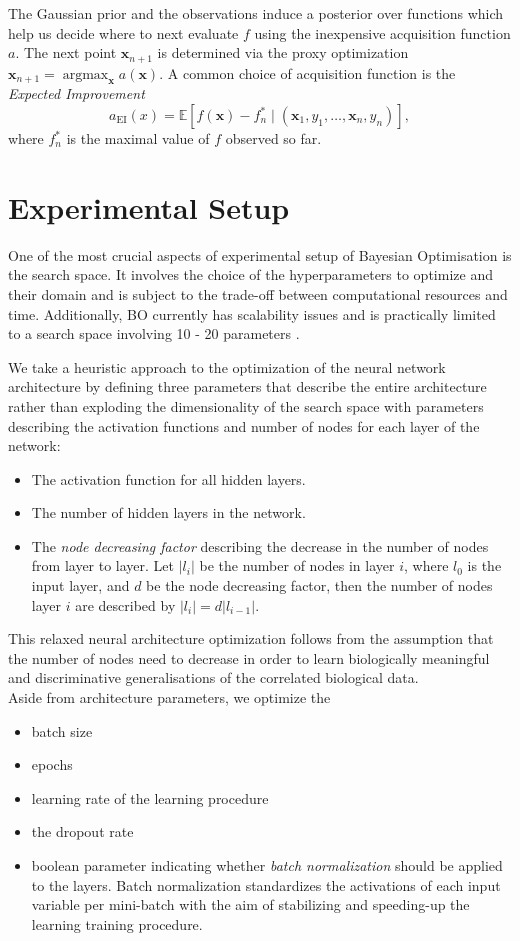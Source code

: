 \documentclass[bsc,frontabs,twoside,singlespacing,parskip,deptreport]{infthesis}     %
\let\Oldsection\section
\renewcommand{\section}{\FloatBarrier\Oldsection}
\begin{document}
The Gaussian prior and the observations induce a posterior over functions which help us decide where to next evaluate \(f\) using the inexpensive acquisition function \(a\). The next point \(\mathbf{x}_{n+1}\) is determined via the proxy optimization  \(\mathbf{x}_{n+1}=\operatorname{argmax}_{\mathbf{x}} a(\mathbf{x})\).
A common choice of acquisition function is the \textit{Expected Improvement}
\[
a_{\mathrm{EI}}(x)=\mathbb{E}[f(\mathbf{x})-f_{n}^{*} \mid\left(\mathbf{x}_{1}, y_{1}, \ldots, \mathbf{x}_{n}, y_{n}\right)],
\] where \(f_{n}^{*}\) is the maximal value of \(f\) observed so far.
\section{Experimental Setup}
One of the most crucial aspects of experimental setup of Bayesian Optimisation is the search space. It involves the choice of the hyperparameters to optimize and their domain and is subject to the trade-off between computational resources and time. Additionally, BO currently has scalability issues and is practically limited to a search space involving 10 - 20 parameters \cite{moriconi_high-dimensional_2020}.

We take a heuristic approach to the optimization of the neural network architecture by defining three parameters that describe the entire architecture rather than exploding the dimensionality of the search space with parameters describing the activation functions and number of nodes for each layer of the network:
\begin{itemize}
    \item The activation function for all hidden layers.
    \item The number of hidden layers in the network.
    \item The \textit{node decreasing factor} describing the decrease in the number of nodes from layer to layer. Let \(|l_i|\) be the number of nodes in layer \(i\), where \(l_0\) is the input layer, and \(d\) be the node decreasing factor, then the number of nodes layer \(i\) are described by \( |l_i| = d|l_{i-1}| \).
\end{itemize}
This relaxed neural architecture optimization follows from the assumption that the number of nodes need to decrease in order to learn biologically meaningful and discriminative generalisations of the correlated biological data. \\
Aside from architecture parameters, we optimize the 
\begin{itemize}
    \item batch size
    \item epochs
    \item learning rate of the learning procedure
    \item the dropout rate
    \item boolean parameter indicating whether \textit{batch normalization} should be applied to the layers. Batch normalization standardizes the activations of each input variable per mini-batch with the aim of stabilizing and speeding-up the learning training procedure.\\
\end{itemize}
\end{document}
